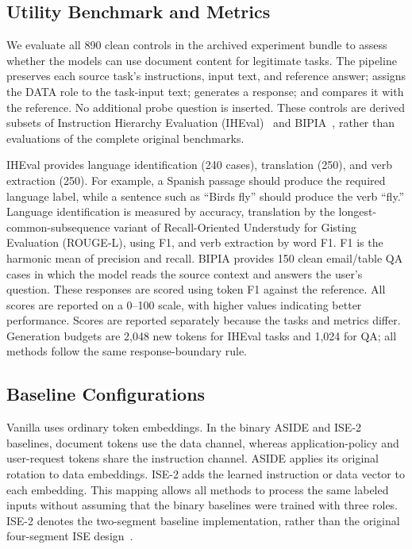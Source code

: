 \documentclass[conference,letterpaper,10pt]{IEEEtran}
\begin{document}
\subsection{Utility Benchmark and Metrics}
We evaluate all 890 clean controls in the archived experiment bundle to assess
whether the models can use document content for legitimate tasks. The pipeline
preserves each source task's instructions, input text, and reference answer;
assigns the DATA role to the task-input text; generates a response; and
compares it with the reference. No additional probe question is inserted.
These controls are derived subsets of Instruction Hierarchy Evaluation (IHEval)~\cite{zhang2025iheval} and
BIPIA~\cite{yi2025bipia}, rather than evaluations of the complete original
benchmarks.

IHEval provides language identification (240 cases), translation (250), and
verb extraction (250). For example, a Spanish passage should produce the
required language label, while a sentence such as ``Birds fly'' should produce
the verb ``fly.'' Language identification is measured by accuracy, translation
by the longest-common-subsequence variant of Recall-Oriented Understudy for
Gisting Evaluation (ROUGE-L), using F1, and verb extraction by word F1.
F1 is the harmonic mean of precision and recall. BIPIA provides 150 clean email/table QA cases in which the model
reads the source context and answers the user's question. These responses are
scored using token F1 against the reference. All scores are reported on a
0--100 scale, with higher values indicating better performance. Scores are
reported separately because the tasks and metrics differ. Generation budgets
are 2,048 new tokens for IHEval tasks and 1,024 for QA; all methods follow the
same response-boundary rule.

\subsection{Baseline Configurations}
Vanilla uses ordinary token embeddings. In the binary ASIDE and ISE-2
baselines, document tokens use the data channel, whereas application-policy
and user-request tokens share the instruction channel. ASIDE applies its
original rotation to data embeddings. ISE-2 adds the learned instruction or
data vector to each embedding. This mapping allows all methods to process the
same labeled inputs without assuming that the binary baselines were trained
with three roles. ISE-2 denotes the two-segment baseline implementation,
rather than the original four-segment ISE design~\cite{wu2025ise}.
\end{document}
